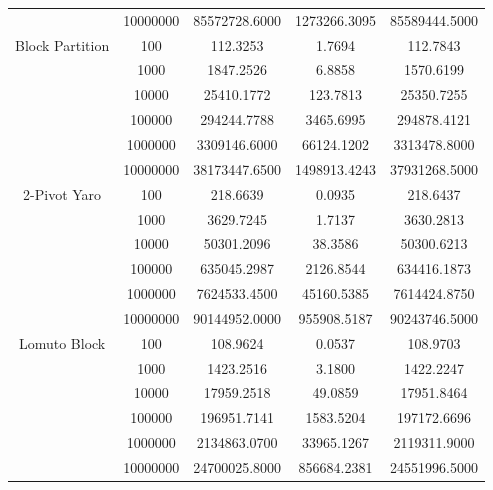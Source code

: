 \documentclass[a4paper,oneside,12pt]{book}
\begin{document}
\begin{center}
\begin{tabular}{ |c c | c c c| }
                        & 10000000 & 85572728.6000  & 1273266.3095  & 85589444.5000 \\
        Block Partition & 100      & 112.3253       & 1.7694        & 112.7843 \\
                        & 1000     & 1847.2526      & 6.8858        & 1570.6199 \\
                        & 10000    & 25410.1772     & 123.7813      & 25350.7255 \\
                        & 100000   & 294244.7788    & 3465.6995     & 294878.4121 \\
                        & 1000000  & 3309146.6000   & 66124.1202    & 3313478.8000 \\
                        & 10000000 & 38173447.6500  & 1498913.4243  & 37931268.5000 \\
        \hline
        2-Pivot Yaro    & 100      & 218.6639       & 0.0935        & 218.6437 \\
                        & 1000     & 3629.7245      & 1.7137        & 3630.2813 \\
                        & 10000    & 50301.2096     & 38.3586       & 50300.6213 \\
                        & 100000   & 635045.2987    & 2126.8544     & 634416.1873 \\
                        & 1000000  & 7624533.4500   & 45160.5385    & 7614424.8750 \\
                        & 10000000 & 90144952.0000  & 955908.5187   & 90243746.5000 \\
        Lomuto Block    & 100      & 108.9624       & 0.0537        & 108.9703 \\
                        & 1000     & 1423.2516      & 3.1800        & 1422.2247 \\
                        & 10000    & 17959.2518     & 49.0859       & 17951.8464 \\
                        & 100000   & 196951.7141    & 1583.5204     & 197172.6696 \\
                        & 1000000  & 2134863.0700   & 33965.1267    & 2119311.9000 \\
                        & 10000000 & 24700025.8000  & 856684.2381   & 24551996.5000 \\
        \hline
    \end{tabular}


\end{center}
\end{document}
